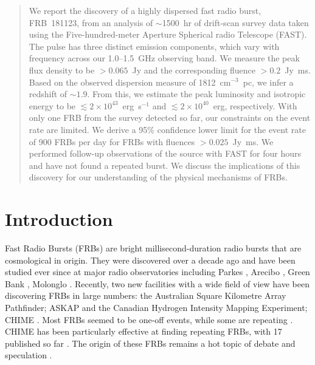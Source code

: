 
\begin{abstract}
We report the discovery of a highly dispersed fast radio burst, FRB~181123, from an analysis of $\sim$1500~hr of drift-scan survey data taken using the Five-hundred-meter Aperture Spherical radio Telescope (FAST). The pulse has three distinct emission components, which vary with frequency across our 1.0--1.5~GHz observing band. We measure the peak flux density to be $>0.065$~Jy and the corresponding fluence $>0.2$~Jy~ms. Based on the observed dispersion measure of 1812~cm$^{-3}$~pc, we infer a redshift of $\sim 1.9$. From this, we estimate the peak luminosity and
isotropic energy to be $\lesssim 2\times10^{43}$~erg~s$^{-1}$ and  $\lesssim 2\times10^{40}$~erg, respectively. With only one FRB from the survey detected so far, our constraints on the event rate are limited. We derive a 95\% confidence lower limit for the event rate of 900 FRBs per day for FRBs with fluences $>0.025$~Jy~ms. 
We performed follow-up observations of the source with FAST for four hours and have not found a repeated burst. We discuss the implications of this discovery for our understanding of the physical mechanisms of FRBs.
\end{abstract}

\section{Introduction}
\label{sec:intro}
Fast Radio Bursts (FRBs) are bright millisecond-duration radio bursts that are cosmological in origin. They were discovered over a decade ago \citep{lbm+07} and have been studied ever since at major radio observatories including Parkes \citep{lbm+07,ksk+12,tsb+13,zhd+19}, Arecibo  \citep{sch+14}, Green Bank \citep{mkl+15}, Molonglo \citep{cfb+17, ffb+18}.
Recently, two new facilities with a wide field of view have been discovering FRBs in large numbers: the Australian Square Kilometre Array Pathfinder; ASKAP \citep{smb+18} and the Canadian Hydrogen Intensity Mapping Experiment; CHIME \citep{chime}.
Most FRBs seemed to be one-off events, while some are repeating \citep{ssh+16}. 
CHIME has been particularly effective at finding repeating FRBs, with 17 published so far \citep{chime_repeater, chime_8}. %
The origin of these FRBs remains a hot topic of debate and speculation \citep{pww+19}.

